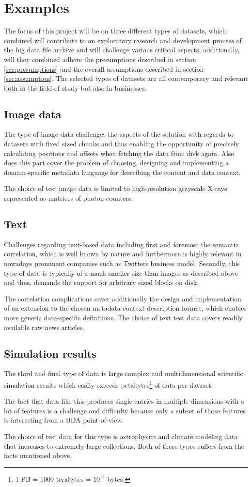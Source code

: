 \section{Examples}
The focus of this project will be on three different types of datasets, which combined will contribute to an exploratory research and development process of the big data file archive and will challenge various critical aspects, additionally, will they combined adhere the presumptions described in section \ref{sec:presumptions} and the overall assumptions described in section \ref{sec:assumption}. The selected types of datasets are all contemporary and relevant both in the field of study but also in businesses.

\subsection*{Image data}
The type of image data challenges the aspects of the solution with regards to datasets with fixed sized chunks and thus enabling the opportunity of precisely calculating positions and offsets when fetching the data from disk again. Also does this part cover the problem of choosing, designing and implementing a domain-specific metadata language for describing the content and data context. 

The choice of test image data is limited to high-resolution grayscale X-rays represented as matrices of photon counters.

\subsection*{Text}
Challenges regarding text-based data including first and foremost the semantic correlation, which is well known by nature and furthermore is highly relevant in nowadays prominent companies such as Twitters business model. Secondly, this type of data is typically of a much smaller size than \eg images as described above and thus, demands the support for arbitrary sized blocks on disk. 
\newline

The correlation complications cover additionally the design and implementation of an extension to the chosen metadata context description format, which enables more generic data-specific definitions. The choice of text test data covers \eg readily available raw news articles.

\subsection*{Simulation results}
The third and final type of data is large complex and multidimensional scientific simulation results which easily exceeds petabytes\footnote{1 PB =  1000 terabytes = $10^{15}$ bytes.} of data per dataset. 

The fact that data like this produces single entries in multiple dimensions with a lot of features is a challenge and difficulty because only a subset of those features is interesting from a BDA point-of-view.

The choice of test data for this type is astrophysics and climate modeling data that increases to extremely large collections. Both of these types suffers from the facts mentioned above.